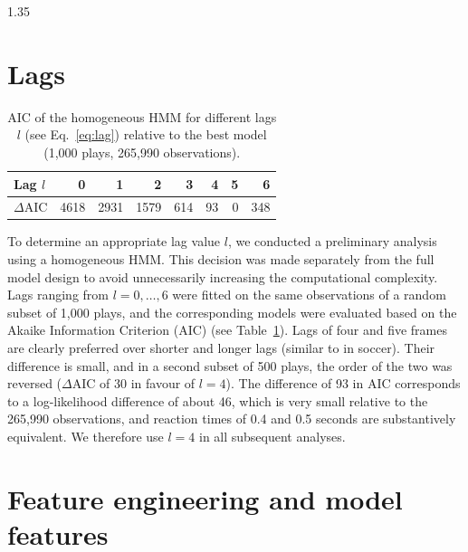 \documentclass[12pt,a4paper]{article}
\begin{document}
\begin{spacing}{1.35}
\section{Lags}
\begin{table}[ht]
\centering
\caption{AIC of the homogeneous HMM for different lags $l$ (see Eq.~\ref{eq:lag}) relative to the best model (1,000 plays, 265,990 observations).}
\label{fig:lags}
\begin{tabular}{lrrrrrrr}
\hline
Lag $l$ & 0 & 1 & 2 & 3 & 4 & 5 & 6 \\
\hline
$\Delta$AIC & 4618 & 2931 & 1579 & 614 & 93 & 0 & 348 \\
\hline
\end{tabular}
\end{table}

To determine an appropriate lag value $l$, we conducted a preliminary analysis using a homogeneous HMM. This decision was made separately from the full model design to avoid unnecessarily increasing the computational complexity. Lags ranging from $l=0, \ldots, 6$ were fitted on the same observations of a random subset of 1,000 plays, and the corresponding models were evaluated based on the Akaike Information Criterion (AIC) (see Table~\ref{fig:lags}). Lags of four and five frames are clearly preferred over shorter and longer lags (similar to \citealp{wu2023evaluation} in soccer). Their difference is small, and in a second subset of 500 plays, the order of the two was reversed ($\Delta$AIC of 30 in favour of $l=4$). The difference of 93 in AIC corresponds to a log-likelihood difference of about 46, which is very small relative to the 265,990 observations, and reaction times of 0.4 and 0.5 seconds are substantively equivalent. We therefore use $l=4$ in all subsequent analyses.

\section{Feature engineering and model features}
\label{app:features}


\end{spacing}
\end{document}
